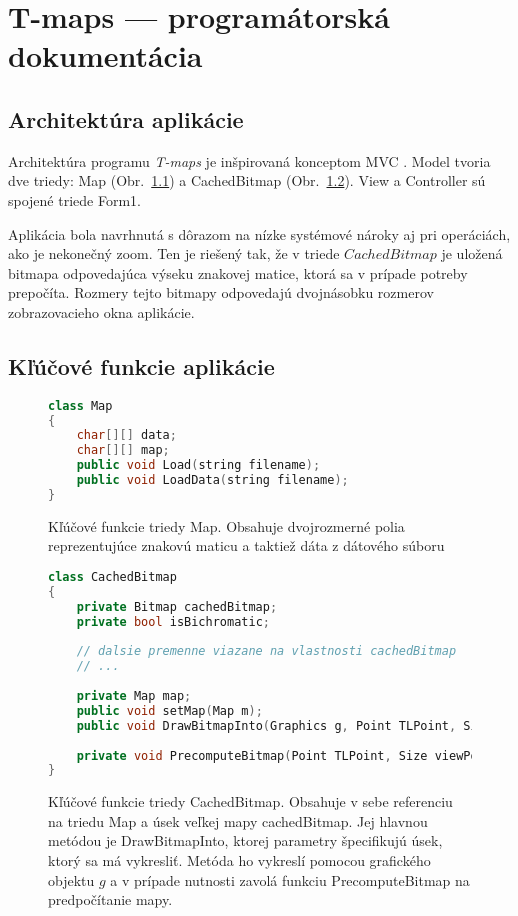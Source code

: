 \chapter{T-maps --- programátorská dokumentácia}
\label{programdoc}

\section{Architektúra aplikácie}
Architektúra programu \emph{T-maps} je inšpirovaná konceptom MVC \cite{krasner_mvc_1988}.
Model tvoria dve triedy: Map (Obr.~\ref{fig:map_interface}) a CachedBitmap (Obr.~\ref{fig:cachedbitmap_interface_plus}).
View a Controller sú spojené triede Form1.


Aplikácia bola navrhnutá s dôrazom na nízke systémové nároky aj pri operáciách, ako je nekonečný zoom. 
Ten je riešený tak, že v triede $CachedBitmap$  je uložená bitmapa odpovedajúca výseku znakovej matice, ktorá sa v prípade potreby prepočíta.
Rozmery tejto bitmapy odpovedajú dvojnásobku rozmerov zobrazovacieho okna aplikácie.

\section{Kľúčové funkcie aplikácie}



\begin{figure}[H]
\begin{lstlisting}[language=C++]
class Map
{
    char[][] data;
    char[][] map;
    public void Load(string filename);
    public void LoadData(string filename);
}
\end{lstlisting}
\caption{Kľúčové funkcie triedy Map. Obsahuje dvojrozmerné polia reprezentujúce znakovú maticu a taktiež dáta z dátového súboru}
\label{fig:map_interface}
\end{figure}



\begin{figure}[H]
\begin{lstlisting}[language=C++]
class CachedBitmap
{
    private Bitmap cachedBitmap;
    private bool isBichromatic;
	
	// dalsie premenne viazane na vlastnosti cachedBitmap
	// ...
	
    private Map map;
    public void setMap(Map m);
    public void DrawBitmapInto(Graphics g, Point TLPoint, Size ViewPortSize, int squareS, bool isBichrom, bool forcePrecomputing = false);
 
    private void PrecomputeBitmap(Point TLPoint, Size viewPortSize);
}
\end{lstlisting}
\caption{Kľúčové funkcie triedy CachedBitmap. 
Obsahuje v sebe referenciu na triedu Map a úsek veľkej mapy cachedBitmap. Jej hlavnou metódou je DrawBitmapInto,
ktorej parametry špecifikujú úsek, ktorý sa má vykresliť. Metóda ho vykreslí pomocou grafického objektu $g$ a v prípade nutnosti zavolá funkciu
PrecomputeBitmap na predpočítanie mapy.}
\label{fig:cachedbitmap_interface_plus}
\end{figure}
